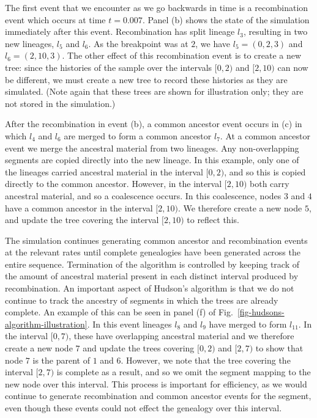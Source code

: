 \documentclass[10pt,letterpaper]{article}
\begin{document}
The first event that we encounter as we go backwards in time is a recombination
event which occurs at time $t=0.007$. Panel (b) shows the state of the
simulation immediately after this event. Recombination has split lineage $l_3$,
resulting in two new lineages, $l_5$ and $l_6$.  As the breakpoint was at
$2$, we have $l_5 = (0, 2, 3)$ and $l_6 = (2, 10, 3)$. The other
effect of this recombination event is to create a new tree: since the histories
of the sample over the intervals $[0, 2)$ and $[2, 10)$ can now be different,
we must create a new tree to record these histories as they are simulated.
(Note again that these trees are shown for illustration only; they are not stored
in the simulation.)

After the recombination in event (b), a common ancestor event occurs in (c) in which
$l_4$ and $l_6$ are merged to form a common ancestor $l_7$.  At a common ancestor
event we merge the ancestral material from two lineages. Any non-overlapping
segments are copied directly into the new lineage. In this example, only one of
the lineages carried ancestral material in the interval $[0, 2)$, and so this
is copied directly to the common ancestor. However, in the interval $[2, 10)$
both carry ancestral material, and so a coalescence occurs.  In this
coalescence, nodes $3$ and $4$ have a common ancestor in the interval $[2,
10)$. We therefore create a new node $5$, and update the tree covering the
interval $[2, 10)$ to reflect this.

The simulation continues generating common ancestor and recombination events at the
relevant rates until complete genealogies have been generated across the
entire sequence. Termination of the algorithm is controlled by keeping track of
the amount of ancestral material present in each distinct interval produced by
recombination. An important aspect of Hudson's algorithm is that we do not
continue to track the ancestry of segments in which the trees are already
complete. An example of this can be seen in panel (f) of
Fig.~\ref{fig-hudsons-algorithm-illustration}.  In this event lineages $l_8$ and
$l_9$ have merged to form $l_{11}$. In the interval $[0, 7)$, these have overlapping
ancestral material and we therefore create a new node $7$ and update the trees
covering $[0, 2)$ and $[2, 7)$ to show that node $7$ is the parent of $1$ and
$6$. However, we note that the tree covering the interval $[2, 7)$ is complete
as a result, and so we omit the segment mapping to the new node over
this interval. This process is important for efficiency, as we would
continue to generate recombination and common ancestor events for the segment,
even though these events could not effect the genealogy over this interval.
\end{document}
